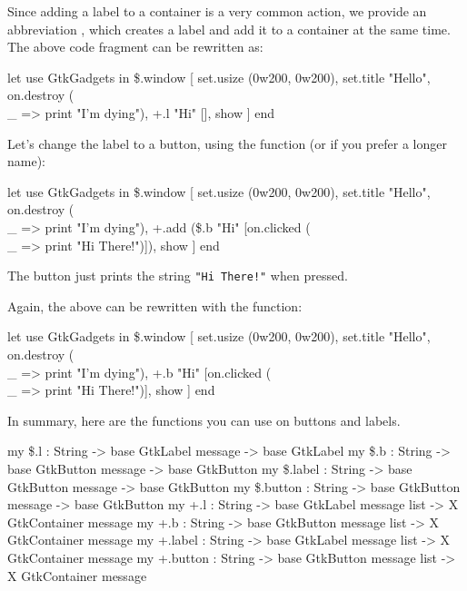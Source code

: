 \documentclass{article}
\begin{document}
Since adding a label to a container is a very common action,
we provide an abbreviation , which creates a label and
add it to a container 
at the same time.  The above code fragment can be rewritten as:
\begin{smldisp}
   let use GtkGadgets
   in  \$.window
        [ set.usize (0w200, 0w200),
          set.title "Hello",
          on.destroy (\\ _ => print "I'm dying"),
          +.l "Hi" [],
          show
        ] 
   end
\end{smldisp}

Let's change the label to a button, using the function  (or
 if you prefer a longer name):
\begin{smldisp}
   let use GtkGadgets
   in  \$.window
        [ set.usize (0w200, 0w200),
          set.title "Hello",
          on.destroy (\\ _ => print "I'm dying"),
          +.add (\$.b "Hi" [on.clicked (\\ _ => print "Hi There!")]),
          show
        ] 
   end
\end{smldisp}

The button just prints the string \verb|"Hi There!"| when pressed.

Again, the above can be rewritten with the  function:
\begin{smldisp}
   let use GtkGadgets
   in  \$.window
        [ set.usize (0w200, 0w200),
          set.title "Hello",
          on.destroy (\\ _ => print "I'm dying"),
          +.b "Hi" [on.clicked (\\ _ => print "Hi There!")],
          show
        ] 
   end
\end{smldisp}

In summary, here are the functions you can use on buttons and labels.
\begin{smldisp}
   my \$.l      : String -> base GtkLabel message -> base GtkLabel
   my \$.b      : String -> base GtkButton message -> base GtkButton
   my \$.label  : String -> base GtkButton message -> base GtkButton
   my \$.button : String -> base GtkButton message -> base GtkButton
   my +.l      : String -> base GtkLabel message list 
                         -> X GtkContainer message
   my +.b      : String -> base GtkButton message list 
                         -> X GtkContainer message
   my +.label  : String -> base GtkLabel message list 
                         -> X GtkContainer message
   my +.button : String -> base GtkButton message list 
                         -> X GtkContainer message
\end{smldisp}
\end{document}
